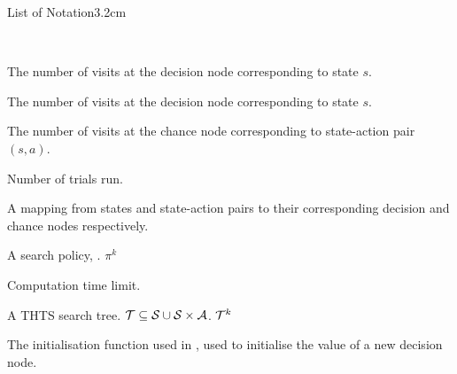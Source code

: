 \begin{mclistof}{List of Notation}{3.2cm}
    \item[$w$] 
    \item[$w^m$] 
    \item[$\mu_{w,i}$] 
    \item[$\mu_{w}^*$] 
    \item[$W$] 
    \item[$ $] 
    \item[$ $] 
    \item[$ $] 
    \item[$ $] 
    \\
    
    \item[\Large\textbf{Trial Based Heuristic Tree Search (Section \ref{sec:2-3-thts})}\hfill\hfill]
    \item[$\cl{B}_Q$]
    \item[$\cl{B}_V$]
    \item[$N(s)$]
        The number of visits at the decision node corresponding to state $s$.
    \item[\mctsmode] 
         \mctsmode
    \item[$N(s)$]
        The number of visits at the decision node corresponding to state $s$.
    \item[$N(s,a)$]
        The number of visits at the chance node corresponding to state-action pair $(s,a)$.
    \item[$n$] 
        Number of trials run.
    \item[\node] 
        A mapping from states and state-action pairs to their corresponding decision and chance nodes respectively.
    \item[$\node(s).V$] 
    \item[$\node(s,a).Q$] 
    \item[$\pi$]
        A search policy, .  $\pi^k$
    \item[$T$] 
        Computation time limit.
    \item[$\cl{T}$] 
        A THTS search tree.  $\mathcal{T}\subseteq \mathcal{S} \cup \mathcal{S}\times\mathcal{A}$.  $\cl{T}^k$
    \item[$\cl{T}^k$] 
    \item[$\Vinit$]
        The initialisation function used in \thtspp, used to initialise the value of a new decision node.


\end{mclistof}
